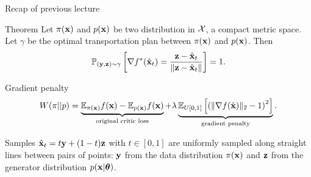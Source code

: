 

\begin{frame}
\titlepage
\end{frame}
\begin{frame}{Recap of previous lecture}
	\begin{block}{Theorem}
		Let $\pi(\mathbf{x})$ and $p(\mathbf{x})$ be two distribution in $\mathcal{X}$, a compact metric space. Let $\gamma$ be the optimal transportation plan between $\pi(\mathbf{x})$ and $p(\mathbf{x})$. Then
		\vspace{-0.4cm}
		\[
			\mathbb{P}_{(\mathbf{y}, \mathbf{z}) \sim \gamma} \left[ \nabla f^*(\hat{\mathbf{x}}_t) = \frac{\mathbf{z} - \hat{\mathbf{x}}_t}{\| \mathbf{z} - \hat{\mathbf{x}}_t \|} \right] = 1.
		\]
		\vspace{-0.6cm}
	\end{block}
	\begin{block}{Gradient penalty}
		\vspace{-0.5cm}
		\[
			W(\pi || p) = \underbrace{\mathbb{E}_{\pi(\mathbf{x})} f(\mathbf{x})  - \mathbb{E}_{p(\mathbf{x})} f(\mathbf{x})}_{\text{original critic loss}} + \lambda \underbrace{\mathbb{E}_{U[0, 1]} \left[ \left( \| \nabla f(\hat{\mathbf{x}}) \|_2 - 1 \right) ^ 2\right]}_{\text{gradient penalty}}.
		\]
		\vspace{-0.5cm}
	\end{block}
	Samples $\hat{\mathbf{x}}_t = t \mathbf{y} + (1 - t) \mathbf{z}$ with $t \in [0, 1]$ are uniformly sampled along straight lines between pairs of points: $\mathbf{y}$ from the data distribution $\pi(\mathbf{x})$ and $\mathbf{z}$ from the generator distribution $p(\mathbf{x} | \boldsymbol{\theta})$.
\end{frame}
